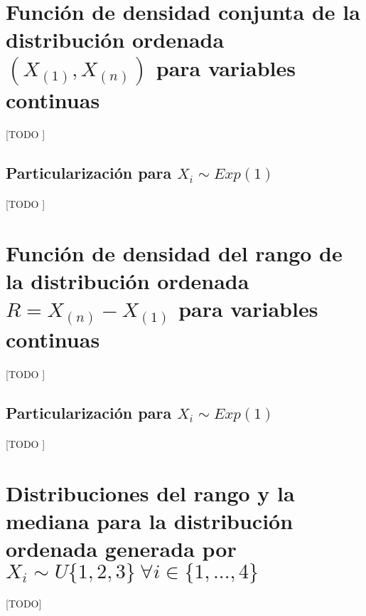 \documentclass{article}
\begin{document}
  \section{Función de densidad conjunta de la distribución ordenada $(X_{(1)}, X_{(n)})$ para variables continuas}
  \label{sec:e2}

    \paragraph{}
    [TODO ]

    \subsection{Particularización para $X_i \sim Exp(1)$}

      \paragraph{}
      [TODO ]

  \section{Función de densidad del rango de la distribución ordenada $R = X_{(n)} - X_{(1)}$ para variables continuas}
  \label{sec:e2}

    \paragraph{}
    [TODO ]

    \subsection{Particularización para $X_i \sim Exp(1)$}

      \paragraph{}
      [TODO ]

  \section{Distribuciones del rango y la mediana para la distribución ordenada generada por $X_i \sim U\{1,2,3\} \ \forall i  \in \{1,...,4\}$}
  \label{sec:e3}

    \paragraph{}
    [TODO]


  \nocite{prob2017}


  
  
\end{document}
